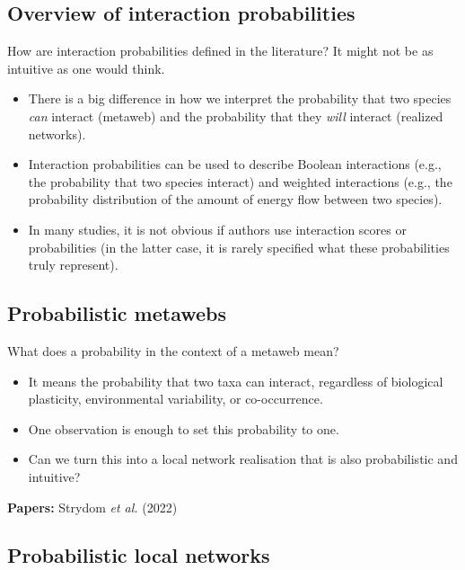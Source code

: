 \documentclass[10pt,oneside]{article}
\begin{document}
\hypertarget{overview-of-interaction-probabilities}{%
\subsection{Overview of interaction
probabilities}\label{overview-of-interaction-probabilities}}

How are interaction probabilities defined in the literature? It might
not be as intuitive as one would think.

\begin{itemize}
\tightlist
\item
  There is a big difference in how we interpret the probability that two
  species \emph{can} interact (metaweb) and the probability that they
  \emph{will} interact (realized networks).
\item
  Interaction probabilities can be used to describe Boolean interactions
  (e.g., the probability that two species interact) and weighted
  interactions (e.g., the probability distribution of the amount of
  energy flow between two species).
\item
  In many studies, it is not obvious if authors use interaction scores
  or probabilities (in the latter case, it is rarely specified what
  these probabilities truly represent).
\end{itemize}

\hypertarget{probabilistic-metawebs}{%
\subsection{Probabilistic metawebs}\label{probabilistic-metawebs}}

What does a probability in the context of a metaweb mean?

\begin{itemize}
\tightlist
\item
  It means the probability that two taxa can interact, regardless of
  biological plasticity, environmental variability, or co-occurrence.
\item
  One observation is enough to set this probability to one.
\item
  Can we turn this into a local network realisation that is also
  probabilistic and intuitive?
\end{itemize}

\textbf{Papers:} Strydom \emph{et al.} (2022)

\hypertarget{probabilistic-local-networks}{%
\subsection{Probabilistic local
networks}\label{probabilistic-local-networks}}
\end{document}
